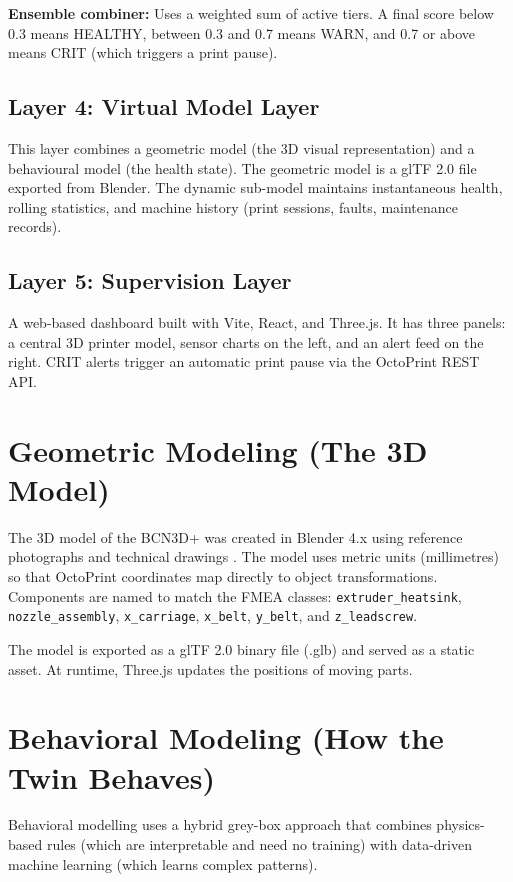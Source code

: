 \textbf{Ensemble combiner:} Uses a weighted sum of active tiers. A final score below 0.3 means HEALTHY, between 0.3 and 0.7 means WARN, and 0.7 or above means CRIT (which triggers a print pause).

\subsection{Layer 4: Virtual Model Layer}

This layer combines a geometric model (the 3D visual representation) and a behavioural model (the health state). The geometric model is a glTF 2.0 file exported from Blender. The dynamic sub-model maintains instantaneous health, rolling statistics, and machine history (print sessions, faults, maintenance records).

\subsection{Layer 5: Supervision Layer}

A web-based dashboard built with Vite, React, and Three.js. It has three panels: a central 3D printer model, sensor charts on the left, and an alert feed on the right. CRIT alerts trigger an automatic print pause via the OctoPrint REST API.

\section{Geometric Modeling (The 3D Model)}

The 3D model of the BCN3D+ was created in Blender 4.x using reference photographs and technical drawings \cite{blender2024manual}. The model uses metric units (millimetres) so that OctoPrint coordinates map directly to object transformations. Components are named to match the FMEA classes: \texttt{extruder\_heatsink}, \texttt{nozzle\_assembly}, \texttt{x\_carriage}, \texttt{x\_belt}, \texttt{y\_belt}, and \texttt{z\_leadscrew}.

The model is exported as a glTF 2.0 binary file (.glb) \cite{khronos2022gltf} and served as a static asset. At runtime, Three.js updates the positions of moving parts.

\section{Behavioral Modeling (How the Twin Behaves)}

Behavioral modelling uses a hybrid grey-box approach that combines physics-based rules (which are interpretable and need no training) with data-driven machine learning (which learns complex patterns).

